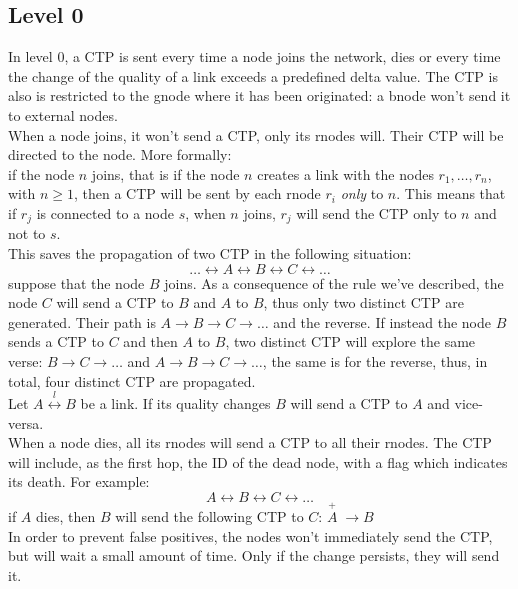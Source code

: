 \documentclass[a4paper]{article}
\begin{document}
\subsection{Level 0}
\label{sec:netdyn-level0}
In level 0, a CTP is sent every time a node joins the network, dies or every
time the change of the quality of a link exceeds a predefined delta value. The
CTP is also is restricted to the gnode where it has been originated: a
bnode won't send it to external nodes.\\
\newline
When a node joins, it won't send a CTP, only its rnodes will.
Their CTP will be directed to the node. More formally:\\
if the node $n$ joins, that is if the node $n$ creates a link
with the nodes $r_1,\dots,r_n$, with $n\ge 1$, then a CTP will
be sent by each rnode $r_i$ \emph{only} to $n$. This means that if $r_j$ is connected to a node $s$, when
$n$ joins, $r_j$ will send the CTP only to $n$ and not to
$s$.\\
This saves the propagation of two CTP in the following situation:
\[\dots \leftrightarrow A\leftrightarrow B\leftrightarrow C\leftrightarrow\dots\]
suppose that the node $B$ joins. As a consequence of the rule we've described,
the node $C$ will send a CTP to $B$ and $A$ to $B$, thus only two distinct CTP are
generated. Their path is $A\rightarrow B\rightarrow C\rightarrow \dots$ and
the reverse. If instead the node $B$ sends a CTP to $C$ and then $A$ to $B$,
two distinct CTP will explore the same verse: $B\rightarrow
C\rightarrow\dots $ and $A\rightarrow B\rightarrow C\rightarrow \dots$, the
same is for the reverse, thus, in total, four distinct CTP are propagated.\\
\newline
Let $A\stackrel{l}{\leftrightarrow}B$ be a link. If its quality changes $B$
will send a CTP to $A$ and vice-versa.\\
\newline
When a node dies, all its rnodes will send a CTP to all their rnodes. The CTP
will include, as the first hop, the ID of the dead node, with a flag which
indicates its death. For example:
\[A\leftrightarrow B\leftrightarrow C\leftrightarrow\dots\]
if $A$ dies, then $B$ will send the following CTP to $C$:
$\stackrel{+}{A}\;\rightarrow B$\\
\newline
In order to prevent false positives, the nodes won't immediately send the CTP, but
will wait a small amount of time. Only if the change persists, they will send it.
\end{document}
